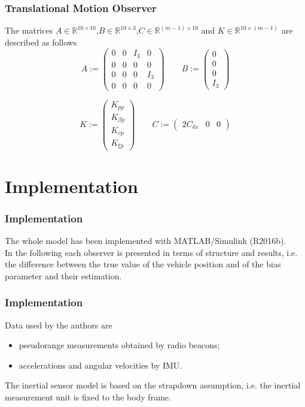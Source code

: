 \documentclass{beamer}
\begin{document}
	\begin{frame}
		\frametitle{Translational Motion Observer}
		The matrices $A \in \mathbb{R}^{10\times 10}$,$B \in \mathbb{R}^{10\times 3}$,$C \in \mathds{R}^{(m-1) \times 10} $ and $K \in \mathds{R}^{10 \times (m-1)}$ are described as follows
		$$
		A :=
		\begin{pmatrix}
		0 & 0 & I_3 & 0 \\ 
		0 & 0 & 0 & 0 \\
		0 & 0 & 0 & I_3 \\
		0 & 0 & 0 & 0
		\end{pmatrix}
		\qquad
		B := 
		\begin{pmatrix}
		0 \\ 0 \\ 0 \\ I_3
		\end{pmatrix}
		$$
		
		$$
		K := 
		\begin{pmatrix}
		K_{pp} \\ K_{\beta p} \\ K_{vp} \\ K_{\xi p}
		\end{pmatrix}
		\qquad
		C :=
		\begin{pmatrix}
		2C_{\delta x} & 0 & 0
		\end{pmatrix}
		$$
	\end{frame}

\section{Implementation}	
	\begin{frame}
		\frametitle{Implementation}
		The whole model has been implemented with MATLAB/Simulink (R2016b).
		\\
		\vspace{0.5cm}
		In the following each observer is presented in terms of structure and results, i.e. the difference between the true value of the vehicle position and of the bias parameter and their estimation.
	\end{frame}
	
	\begin{frame}
		\frametitle{Implementation}
		Data used by the authors are \\
		\begin{itemize}
			\item pseudorange measurements obtained by radio beacons;
			\item accelerations and angular velocities by IMU. 
		\end{itemize}
		\vspace{0.5cm}
		The inertial sensor model is based on the strapdown assumption, i.e. the inertial measurement unit is fixed to the body frame.
	\end{frame}
	
\end{document}
